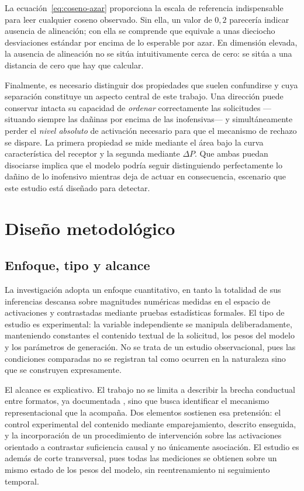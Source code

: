 La ecuación~\eqref{eq:coseno-azar} proporciona la escala de referencia
indispensable para leer cualquier coseno observado. Sin ella, un valor de
$0{,}2$ parecería indicar ausencia de alineación; con ella se comprende que
equivale a unas dieciocho desviaciones estándar por encima de lo esperable por
azar. En dimensión elevada, la ausencia de alineación no se sitúa
intuitivamente cerca de cero: se sitúa a una distancia de cero que hay que
calcular.

Finalmente, es necesario distinguir dos propiedades que suelen confundirse y
cuya separación constituye un aspecto central de este trabajo. Una dirección
puede conservar intacta su capacidad de \textit{ordenar} correctamente las
solicitudes —situando siempre las dañinas por encima de las inofensivas— y
simultáneamente perder el \textit{nivel absoluto} de activación necesario para
que el mecanismo de rechazo se dispare. La primera propiedad se mide mediante
el área bajo la curva característica del receptor y la segunda mediante
$\Delta P$. Que ambas puedan disociarse implica que el modelo podría seguir
distinguiendo perfectamente lo dañino de lo inofensivo mientras deja de actuar
en consecuencia, escenario que este estudio está diseñado para detectar.


\section{Diseño metodológico}

\justifying

\subsection{Enfoque, tipo y alcance}

La investigación adopta un enfoque cuantitativo, en tanto la totalidad de sus
inferencias descansa sobre magnitudes numéricas medidas en el espacio de
activaciones y contrastadas mediante pruebas estadísticas formales. El tipo de
estudio es experimental: la variable independiente se manipula deliberadamente,
manteniendo constantes el contenido textual de la solicitud, los pesos del
modelo y los parámetros de generación. No se trata de un estudio observacional,
pues las condiciones comparadas no se registran tal como ocurren en la
naturaleza sino que se construyen expresamente.

El alcance es explicativo. El trabajo no se limita a describir la brecha
conductual entre formatos, ya documentada \parencite{andriushchenko2024}, sino
que busca identificar el mecanismo representacional que la acompaña. Dos
elementos sostienen esa pretensión: el control experimental del contenido
mediante emparejamiento, descrito enseguida, y la incorporación de un
procedimiento de intervención sobre las activaciones orientado a contrastar
suficiencia causal y no únicamente asociación. El estudio es además de corte
transversal, pues todas las mediciones se obtienen sobre un mismo estado de los
pesos del modelo, sin reentrenamiento ni seguimiento temporal.

